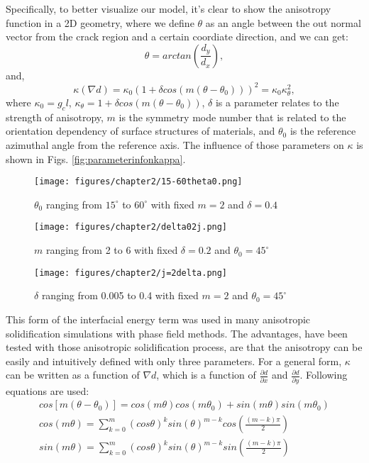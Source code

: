 \documentclass[3p,10pt,sort&compress]{elsarticle}
\begin{document}
Specifically, to better visualize our model, it's clear to show the anisotropy function in a 2D geometry, where we define $\theta$ as an angle between the out normal vector from the crack region and a certain coordiate direction, and we can get:
\begin{equation}
  \theta = arctan(\frac{d_y}{d_x}),
\end{equation}
and,
\begin{equation}\label{eq:kappatheta}
  \kappa(\nabla d) = \kappa_0 (1 + \delta cos(m(\theta - \theta_0)))^2 = \kappa_0 \kappa_{\theta}^2,
\end{equation}
where $\kappa_0 = g_c l$, $\kappa_{\theta} = 1 + \delta cos(m(\theta - \theta_0))$, $\delta$ is a parameter relates to the strength of anisotropy, $m$ is the symmetry mode number that is related to the orientation dependency of surface structures of materials, and $\theta_0$ is the reference azimuthal angle from the reference axis. The influence of those parameters on $\kappa$ is shown in Figs. \ref{fig:parameterinfonkappa}.
\begin{figure*}[!htb]
 \begin{subfigure}{0.32\textwidth}
    \texttt{[image: figures/chapter2/15-60theta0.png]}
    \caption{$\theta_0$ ranging from $15^\circ$ to $60^\circ$ with fixed $m=2$ and $\delta=0.4$ }
    \label{fig:theta0influence}
  \end{subfigure}%
  \begin{subfigure}{0.32\textwidth}
    \texttt{[image: figures/chapter2/delta02j.png]}
    \caption{$m$ ranging from 2 to 6 with fixed $\delta=0.2$ and $\theta_0=45^\circ$}
    \label{fig:modenumberj}
  \end{subfigure}
  \begin{subfigure}{0.32\textwidth}
    \texttt{[image: figures/chapter2/j=2delta.png]}
    \caption{$\delta$ ranging from 0.005 to 0.4 with fixed $m=2$ and $\theta_0=45^\circ$}
    \label{fig:deltainfluence}
  \end{subfigure}
  \caption{Impact of the parameters on the anisotropy of $\kappa$}
  \label{fig:parameterinfonkappa}
\end{figure*}


This form of the interfacial energy term was used in many anisotropic solidification simulations with phase field methods\cite{kobayashi1993modeling,mcfadden1993phase}. The advantages, have been tested with those anisotropic solidification process, are that the anisotropy can be easily and intuitively defined with only three parameters. For a general form, $\kappa$ can be written as a function of $\nabla d$, which is a function of $\frac{\partial d}{\partial x}$ and $\frac{\partial d}{\partial y}$. Following equations are used:
\begin{eqnarray}
  cos[m(\theta-\theta_0)] = cos(m\theta)cos(m\theta_0) + sin(m\theta) sin(m\theta_0)\\
  cos(m\theta) = \sum_{k=0}^{m}(cos\theta)^k sin(\theta)^{m-k} cos(\frac{(m-k)\pi}{2})\\
  sin(m\theta) = \sum_{k=0}^{m}(cos\theta)^k sin(\theta)^{m-k} sin(\frac{(m-k)\pi}{2})
\end{eqnarray}
\end{document}
